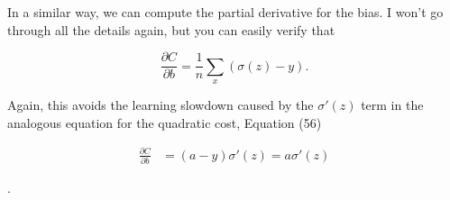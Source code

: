 In a similar way, we can compute the partial derivative for the bias. I won't go through all the details again, but you can easily verify that

\begin{equation}
\frac{\partial C}{\partial b} = \frac{1}{n} \sum_x (\sigma(z)-y).
\tag{62}
\end{equation}

\noindent Again, this avoids the learning slowdown caused by the $\sigma'(z)$ term in the analogous equation for the quadratic cost, Equation (56)

\begin{align*}
\frac{\partial C}{\partial b} &= (a-y)\sigma'(z) = a \sigma'(z) \nonumber
\end{align*}

\noindent.



